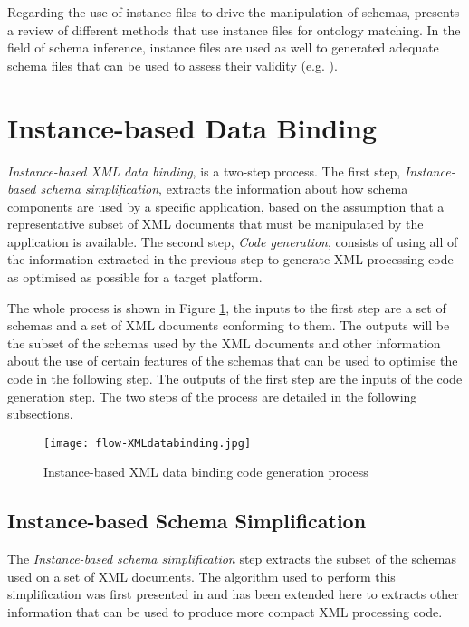 \documentclass{sig-alternate}
\begin{document}
Regarding the use of instance files to drive the manipulation of schemas, \cite{coll:rahm} presents a review of different methods that use instance files for ontology matching. 
In the field of  schema inference, instance files are used as well to generated adequate schema files that can be used to assess their validity (e.g. \cite{proc:bex, proc:hegewald, proc:min}). 


\section{Instance-based Data Binding}  

\textit{Instance-based XML data binding}, is a two-step process. 
The first step, \textit{Instance-based schema simplification}, extracts the information about how schema components are used by a specific application, based on the assumption that a representative subset of XML documents that must be manipulated by the application is available.  The second step, \textit{Code generation}, consists of using all of the information extracted in the previous step to generate XML processing code as optimised as possible for a target platform.

The whole process is shown in Figure \ref{fig:flow-XMLdatabinding}, the inputs to the first step are a set of schemas and a set of XML documents conforming to them. The outputs will be the subset of the schemas used by the XML documents and other information about the use of certain features of the schemas that can be used to optimise the code in the following step. The outputs of the first step are the inputs of the code generation step. The two steps of the process are detailed in the following subsections.

\begin{figure}
\centering
  \texttt{[image: flow-XMLdatabinding.jpg]}\\
  \caption{Instance-based XML data binding code generation process}\label{fig:flow-XMLdatabinding}
\end{figure} 

\subsection{Instance-based Schema Simplification}  

The \textit{Instance-based schema simplification} step extracts the subset of the schemas used on a set of XML documents. The algorithm used to perform this simplification was first presented in \cite{proc:tamayo4} and has been extended here to extracts other information that can be used to produce  more compact XML processing code. 
\end{document}
